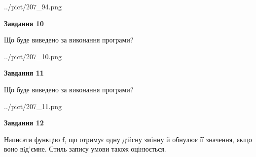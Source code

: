 \documentclass[12pt, ukrainian]{article}
\begin{document}
{\begin {large}
\begin{center}
	{../pict/207_94.png}
\end{center}
\newpage

{\begin {center}\textbf{Завдання 10}\end {center}}

Що буде виведено за виконання програми?\par
\begin{center}
	{../pict/207_10.png}
\end{center}
\newpage

{\begin {center}\textbf{Завдання 11}\end {center}}

Що буде виведено за виконання програми?\par
\begin{center}
	{../pict/207_11.png}
\end{center}
\newpage

{\begin {center}\textbf{Завдання 12}\end {center}}


Написати функцiю f, що отримує одну дiйсну змінну й обнулює її значення, якщо воно вiд'ємне. Стиль запису умови також оцінюється.\par
\newpage

\end {large}}
\end{document}
